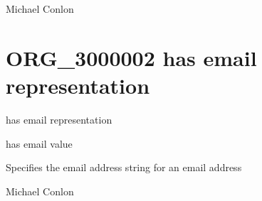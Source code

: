 \documentclass[letterpaper,10pt,english]{sphinxmanual}
\begin{document}
\begin{sphinxShadowBox}

\sphinxAtStartPar
Michael Conlon 
\end{sphinxShadowBox}
\begin{quote}

\ignorespaces \end{quote}


\section{ORG\_3000002 \sphinxhyphen{} has email representation}
\label{\detokenize{doc-ORG_3000002:org-3000002-has-email-representation}}\label{\detokenize{doc-ORG_3000002:index-0}}\label{\detokenize{doc-ORG_3000002::doc}}
\begin{sphinxShadowBox}

\sphinxAtStartPar
has email representation
\end{sphinxShadowBox}

\begin{sphinxShadowBox}

\sphinxAtStartPar
has email value
\end{sphinxShadowBox}

\begin{sphinxShadowBox}

\sphinxAtStartPar
{\hyperref[\detokenize{doc-OBI_0002815::doc}]{}}
\end{sphinxShadowBox}

\begin{sphinxShadowBox}

\sphinxAtStartPar
Specifies the email address string for an email address
\end{sphinxShadowBox}

\begin{sphinxShadowBox}

\sphinxAtStartPar
Michael Conlon 
\end{sphinxShadowBox}
\end{document}

